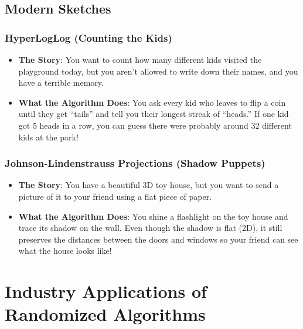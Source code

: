 \documentclass[twoside,12pt]{book}
\theoremstyle{plain}
\theoremstyle{definition}
\theoremstyle{remark}
\begin{document}
\section{Modern Sketches}

\subsection{HyperLogLog (Counting the Kids)}
\begin{itemize}
    \item \textbf{The Story}: You want to count how many different kids visited the playground today, but you aren't allowed to write down their names, and you have a terrible memory.
    \item \textbf{What the Algorithm Does}: You ask every kid who leaves to flip a coin until they get ``tails'' and tell you their longest streak of ``heads.'' If one kid got 5 heads in a row, you can guess there were probably around 32 different kids at the park!
\end{itemize}

\subsection{Johnson-Lindenstrauss Projections (Shadow Puppets)}
\begin{itemize}
    \item \textbf{The Story}: You have a beautiful 3D toy house, but you want to send a picture of it to your friend using a flat piece of paper.
    \item \textbf{What the Algorithm Does}: You shine a flashlight on the toy house and trace its shadow on the wall. Even though the shadow is flat (2D), it still preserves the distances between the doors and windows so your friend can see what the house looks like!
\end{itemize}

\chapter{Industry Applications of Randomized Algorithms}
\label{app:applications}
\end{document}
